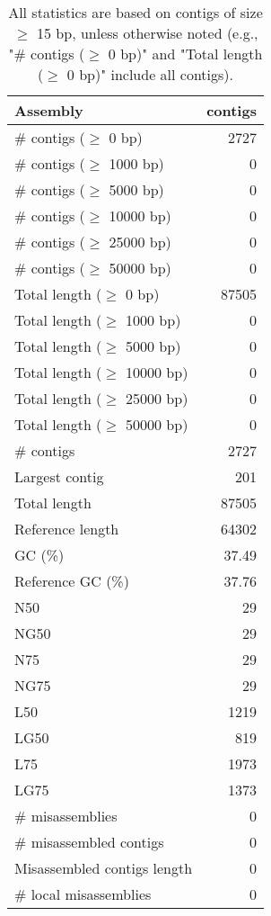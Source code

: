 \documentclass[12pt,a4paper]{article}
\begin{document}
\begin{table}[ht]
\begin{center}
\caption{All statistics are based on contigs of size $\geq$ 15 bp, unless otherwise noted (e.g., "\# contigs ($\geq$ 0 bp)" and "Total length ($\geq$ 0 bp)" include all contigs).}
\begin{tabular}{|l*{1}{|r}|}
\hline
Assembly & contigs \\ \hline
\# contigs ($\geq$ 0 bp) & 2727 \\ \hline
\# contigs ($\geq$ 1000 bp) & 0 \\ \hline
\# contigs ($\geq$ 5000 bp) & 0 \\ \hline
\# contigs ($\geq$ 10000 bp) & 0 \\ \hline
\# contigs ($\geq$ 25000 bp) & 0 \\ \hline
\# contigs ($\geq$ 50000 bp) & 0 \\ \hline
Total length ($\geq$ 0 bp) & 87505 \\ \hline
Total length ($\geq$ 1000 bp) & 0 \\ \hline
Total length ($\geq$ 5000 bp) & 0 \\ \hline
Total length ($\geq$ 10000 bp) & 0 \\ \hline
Total length ($\geq$ 25000 bp) & 0 \\ \hline
Total length ($\geq$ 50000 bp) & 0 \\ \hline
\# contigs & 2727 \\ \hline
Largest contig & 201 \\ \hline
Total length & 87505 \\ \hline
Reference length & 64302 \\ \hline
GC (\%) & 37.49 \\ \hline
Reference GC (\%) & 37.76 \\ \hline
N50 & 29 \\ \hline
NG50 & 29 \\ \hline
N75 & 29 \\ \hline
NG75 & 29 \\ \hline
L50 & 1219 \\ \hline
LG50 & 819 \\ \hline
L75 & 1973 \\ \hline
LG75 & 1373 \\ \hline
\# misassemblies & 0 \\ \hline
\# misassembled contigs & 0 \\ \hline
Misassembled contigs length & 0 \\ \hline
\# local misassemblies & 0 \\ \hline

\end{tabular}
\end{center}
\end{table}
\end{document}
